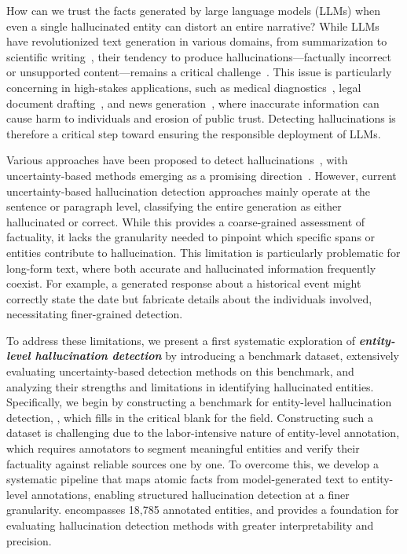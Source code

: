 How can we trust the facts generated by large language models (LLMs) when even a single hallucinated entity can distort an entire narrative? While LLMs have revolutionized text generation in various domains, from summarization to scientific writing~\citep{Liang2024MappingTI}, their tendency to produce hallucinations---factually incorrect or unsupported content---remains a critical challenge~\citep{Xu2024HallucinationII}.
This issue is particularly concerning in high-stakes applications, such as medical diagnostics~\citep{Chen2024EvaluatingLL}, legal document drafting~\citep{lin2024legaldocumentsdraftingfinetuned}, and news generation~\citep{odabaşı2025unravelingcapabilitieslanguagemodels}, where inaccurate information can cause harm to individuals and erosion of public trust. Detecting hallucinations is therefore a critical step toward ensuring the responsible deployment of LLMs.

Various approaches have been proposed to detect hallucinations~\citep{Luo2024HallucinationDA}, with uncertainty-based methods emerging as a promising direction~\citep{Zhang2023EnhancingUH}. 
However, current uncertainty-based hallucination detection approaches mainly operate at the sentence or paragraph level, classifying the entire generation as either hallucinated or correct. 
While this provides a coarse-grained assessment of factuality, it lacks the granularity needed to pinpoint which specific spans or entities contribute to hallucination. This limitation is particularly problematic for long-form text,  where both accurate and hallucinated information frequently coexist. For example, a generated response about a historical event might correctly state the date but fabricate details about the individuals involved, necessitating finer-grained detection. 


To address these limitations, we present a first systematic exploration of \emph{\textbf{entity-level hallucination detection}} by introducing a benchmark dataset, extensively evaluating uncertainty-based detection methods on this benchmark, and analyzing their strengths and limitations in identifying hallucinated entities. Specifically, we begin by constructing a benchmark for entity-level hallucination detection, \dataset, which fills in the critical blank for the field. Constructing such a dataset is challenging due to the labor-intensive nature of entity-level annotation, which requires annotators to segment meaningful entities and verify their factuality against reliable sources one by one. To overcome this, we develop a systematic pipeline that maps atomic facts from model-generated text to entity-level annotations, enabling structured hallucination detection at a finer granularity. \dataset encompasses 18,785 annotated entities, and provides a foundation for evaluating hallucination detection methods with greater interpretability and precision.

